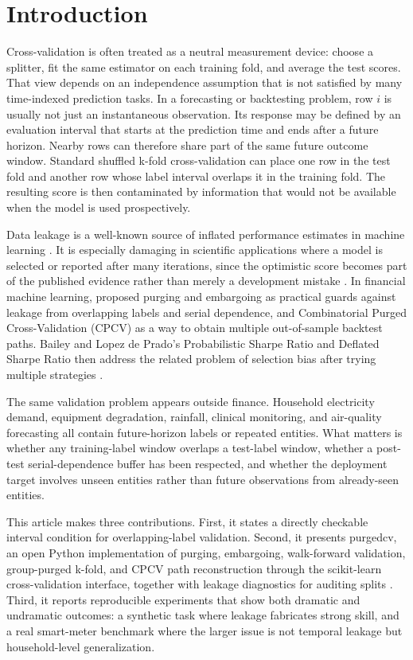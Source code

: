 \documentclass[11pt]{article}
\newcommand{\pcv}{\textsf{purgedcv}}
\newcommand{\pkg}[1]{\textsf{#1}}
\begin{document}
\section{Introduction}

Cross-validation is often treated as a neutral measurement device: choose a
splitter, fit the same estimator on each training fold, and average the test
scores. That view depends on an independence assumption that is not satisfied by
many time-indexed prediction tasks. In a forecasting or backtesting problem, row
$i$ is usually not just an instantaneous observation. Its response may be
defined by an evaluation interval that starts at the prediction time and ends
after a future horizon. Nearby rows can therefore share part of the same future
outcome window. Standard shuffled k-fold cross-validation can place one row in
the test fold and another row whose label interval overlaps it in the training
fold. The resulting score is then contaminated by information that would not be
available when the model is used prospectively.

Data leakage is a well-known source of inflated performance estimates in
machine learning \citep{kaufman2012}. It is especially damaging in scientific
applications where a model is selected or reported after many iterations, since
the optimistic score becomes part of the published evidence rather than merely a
development mistake \citep{mcdermott2021}. In financial machine learning,
\citet{lopezdeprado2018afml} proposed purging and embargoing as practical
guards against leakage from overlapping labels and serial dependence, and
Combinatorial Purged Cross-Validation (CPCV) as a way to obtain multiple
out-of-sample backtest paths. Bailey and Lopez de Prado's Probabilistic Sharpe
Ratio and Deflated Sharpe Ratio then address the related problem of selection
bias after trying multiple strategies \citep{bailey2012psr,bailey2014dsr}.

The same validation problem appears outside finance. Household electricity
demand, equipment degradation, rainfall, clinical monitoring, and air-quality
forecasting all contain future-horizon labels or repeated entities. What matters
is whether any training-label window overlaps a test-label window, whether a
post-test serial-dependence buffer has been respected, and whether the
deployment target involves unseen entities rather than future observations from
already-seen entities.

This article makes three contributions. First, it states a directly checkable
interval condition for overlapping-label validation. Second, it presents \pcv,
an open Python implementation of purging, embargoing, walk-forward validation,
group-purged k-fold, and CPCV path reconstruction through the
\pkg{scikit-learn} cross-validation interface, together with leakage
diagnostics for auditing splits \citep{pedregosa2011sklearn,purgedcv2026}.
Third, it reports reproducible experiments that show both dramatic and
undramatic outcomes: a synthetic task where leakage fabricates strong skill, and
a real smart-meter benchmark where the larger issue is not temporal leakage but
household-level generalization.
\end{document}

